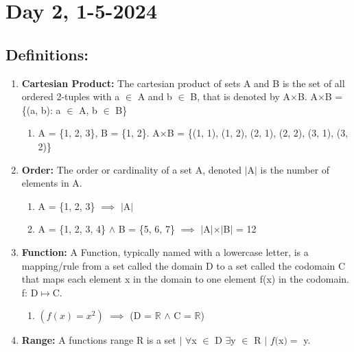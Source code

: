 \documentclass[12pt]{article}
\begin{document}
\section{Day 2, 1-5-2024}
\subsection{Definitions:}
\begin{enumerate}

    \item\textbf{Cartesian Product: } The cartesian product of sets A and B is the set of all ordered 2-tuples with a \(\in\) A and b \(\in\) B, that is denoted by A\(\times\)B. A\(\times\)B = \{(a, b): a \(\in\) A, b \(\in\) B\}
    \begin{enumerate}\begin{enumerate}
        \item A = \{1, 2, 3\}, B = \{1, 2\}. A\(\times\)B = \{(1, 1), (1, 2), (2, 1), (2, 2), (3, 1), (3, 2)\}
    \end{enumerate}\end{enumerate}
    \item\textbf{Order: }The order or cardinality of a set A, denoted \(\vert\)A\(\vert\) is the number of elements in A.
    \begin{enumerate}\begin{enumerate}
        \item A = \{1, 2, 3\} \(\implies\) \(\vert\)A\(\vert\)
        \item A = \{1, 2, 3, 4\} \(\land\) B = \{5, 6, 7\} \(\implies\) \(\vert\)A\(\vert\)\(\times\)\(\vert\)B\(\vert\) = 12
    \end{enumerate}\end{enumerate}
    \item\textbf{Function: }A Function, typically named with a lowercase letter, is a mapping/rule from a set called the domain D to a set called the codomain C that maps each element x in the domain to one element f(x) in the codomain. f: D\(\mapsto\)C.
    \begin{enumerate}\begin{enumerate}
        \item \((f(x) = x^2)\) \(\implies\) (D = $\mathbb{R}$ \(\land\) C = $\mathbb{R}$)
    \end{enumerate}\end{enumerate}
    \item\textbf{Range: }A functions range R is a set \(\vert\) \(\forall\)x \(\in\) D \(\exists\)y \(\in\) R \(\vert\) \(f(\)x\() =\) y.

\end{enumerate}
\end{document}
